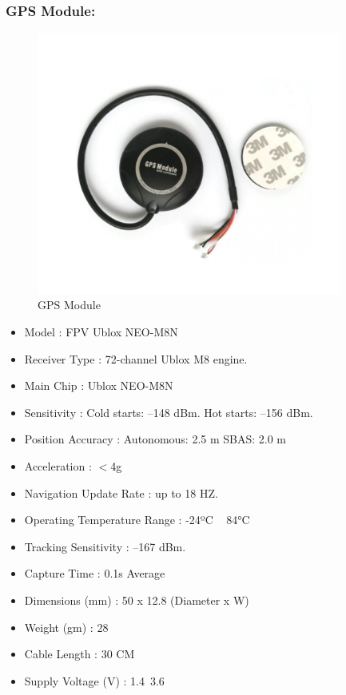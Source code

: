 \newpage

\subsubsection{GPS Module:}
\begin{figure}[h!]
\centering
\includegraphics[width=10cm]{./Figures/gps_qc.png}
\caption{GPS Module}
\label{gps_qc}
\end{figure}

\begin{itemize}
    \item Model				: FPV Ublox NEO-M8N
    \item Receiver Type			: 72-channel Ublox M8 engine.
    \item Main Chip			: Ublox NEO-M8N
    \item Sensitivity			: Cold starts: –148 dBm. Hot starts: –156 dBm.
    \item Position Accuracy		: Autonomous: 2.5 m SBAS: 2.0 m
    \item Acceleration			: $<$4g
    \item Navigation Update Rate		: up to 18 HZ.
    \item Operating Temperature Range	: -24ºC ~ 84°C
    \item Tracking Sensitivity		: –167 dBm.
    \item Capture Time			: 0.1s Average
    \item Dimensions (mm)	: 50 x 12.8 (Diameter x W)
    \item Weight (gm)			: 28
    \item Cable Length			: 30 CM
    \item Supply Voltage (V)		: 1.4~3.6
\end{itemize}

